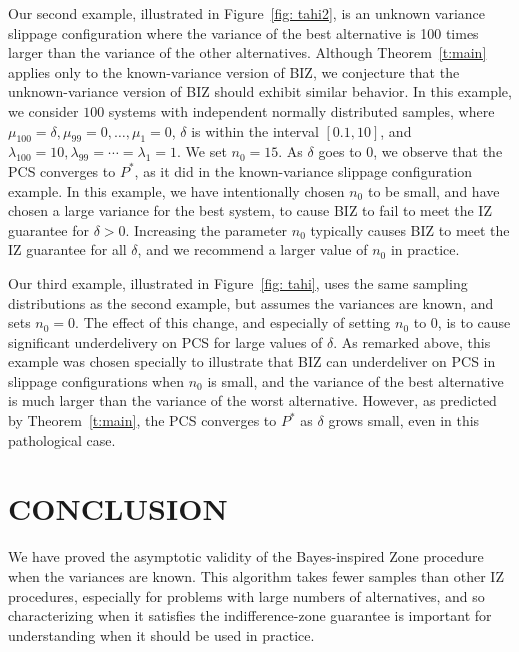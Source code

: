 \documentclass{wscpaperproc}
\theoremstyle{wsc}
\begin{document}
Our second example, illustrated in Figure~\ref{fig: tahi2}, is an unknown variance slippage configuration where the variance of the best alternative is 100 times larger than the variance of the other alternatives. Although Theorem~\ref{t:main} applies only to the known-variance version of BIZ, we conjecture that the unknown-variance version of BIZ should exhibit similar behavior.
In this example, we consider $100$ systems with independent normally distributed samples, where $\mu_{100}=\delta,\mu_{99}=0,\dots,\mu_{1}=0$, $\delta$ is within the interval $[0.1,10]$, and $\lambda_{100}=10,\lambda_{99}=\cdots=\lambda_{1}=1$. We set $n_{0}=15$.
As $\delta$ goes to $0$, we observe that the PCS converges to $P^*$, as it did in the known-variance slippage configuration example.
In this example, we have intentionally chosen $n_0$ to be small, and have chosen a large variance for the best system, to cause BIZ to fail to meet the IZ guarantee for $\delta>0$.
Increasing the parameter $n_0$ typically causes BIZ to meet the IZ guarantee for all $\delta$, and we recommend a larger value of $n_0$ in practice.

Our third example, illustrated in Figure~\ref{fig: tahi}, uses the same sampling distributions as the second example, but assumes the variances are known, and sets $n_0=0$.
The effect of this change, and especially of setting $n_0$ to $0$, is to cause significant underdelivery on PCS for large values of $\delta$.  
As remarked above, this example was chosen specially to illustrate that BIZ can underdeliver on PCS in slippage configurations when $n_0$ is small, and the variance of the best alternative is much larger than the variance of the worst alternative.  However, as predicted by Theorem~\ref{t:main}, the PCS converges to $P^*$ as $\delta$ grows small, even in this pathological case. 




\section{CONCLUSION}

We have proved the asymptotic validity of the Bayes-inspired Zone
procedure \cite{Frazier:BIZ} when the variances are known.
This algorithm takes fewer samples than other IZ procedures, especially for
problems with large numbers of alternatives, and so characterizing when it
satisfies the indifference-zone guarantee is important for understanding when
it should be used in practice.

\end{document}
